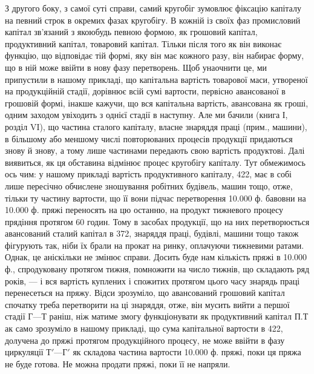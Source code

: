 З другого боку, з самої суті справи, самий кругобіг зумовлює фіксацію
капіталу на певний строк в окремих фазах кругобігу. В кожній із
своїх фаз промисловий капітал зв’язаний з якоюбудь певною формою,
як грошовий капітал, продуктивний капітал, товаровий капітал. Тільки
після того як він виконає функцію, що відповідає тій формі, яку він
має кожного разу, він набирає форму, що в ній може ввійти в нову
фазу перетворень. Щоб унаочнити це, ми припустили в нашому прикладі,
що капітальна вартість товарової маси, утвореної на продукційній стадії,
дорівнює всій сумі вартости, первісно авансованої в грошовій формі,
інакше кажучи, що вся капітальна вартість, авансована як гроші, одним
заходом увіходить з однієї стадії в наступну. Але ми бачили (книга І,
розділ VI), що частина сталого капіталу, власне знаряддя праці (прим.,
машини), в більшому або меншому числі повторюваних процесів продукції
придаються знову й знову, а тому лише частинами передають свою вартість
продуктові. Далі виявиться, як ця обставина відмінює процес кругобігу
капіталу. Тут обмежимось ось чим: у нашому прикладі вартість
продуктивного капіталу, 422, має в собі лише пересічно обчислене
зношування робітних будівель, машин тощо, отже, тільки ту частину
вартости, що її вони підчас перетворення 10.000 ф. бавовни на 10.000 ф.
пряжі переносять на цю останню, на продукт тижневого процесу прядіння
протягом 60 годин. Тому в засобах продукції, що на них перетворюється
авансований сталий капітал в 372, знаряддя праці, будівлі,
машини тощо також фігурують так, ніби їх брали на прокат на ринку,
оплачуючи тижневими ратами. Однак, це аніскільки не змінює справи.
Досить буде нам кількість пряжі в 10.000 ф., спродуковану протягом
тижня, помножити на число тижнів, що складають ряд років, — і вся
вартість куплених і спожитих протягом цього часу знарядь праці перенесеться
на пряжу. Відси зрозуміло, що авансований грошовий капітал
спочатку треба перетворити на ці знаряддя, отже, він мусить вийти а
першої стадії $Г — Т$ раніш, ніж матиме змогу функціонувати як продуктивний
капітал $П. Т$ак само зрозуміло в нашому прикладі, що сума
капітальної вартости в 422, долучена до пряжі протягом продукційного
процесу, не може ввійти в фазу циркуляції $Т' — Г'$ як складова
частина вартости 10.000 ф. пряжі, поки ця пряжа не буде готова.
Не можна продати пряжі, поки її не напряли.

